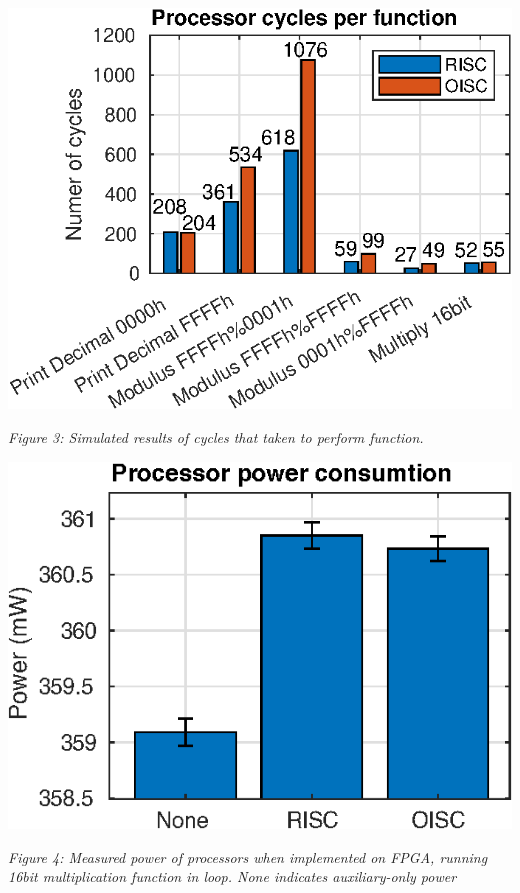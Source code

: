 \documentclass[portrait,color=UCLmidgreen,margin=1.5cm,bannerheight=8cm,logoheight=3.5cm]{uclposter}
\begin{document}
\begin{tcolorbox}[title=Results,beforeafter skip=22pt]
\begin{multicols}{3}
		\columnbreak
		\includegraphics[width=\linewidth]{../tests/cycles.eps}
		\begin{center}
			\textit{Figure 3: Simulated results of cycles that taken to perform function. }
		\end{center}
	
		\columnbreak
		\includegraphics[width=\linewidth]{../tests/power.eps}
		\begin{center}
			\textit{Figure 4: Measured power of processors when implemented on FPGA, running 16bit multiplication function in loop. None indicates auxiliary-only power}
		\end{center}

	\end{multicols}
	

\end{tcolorbox}
\end{document}
